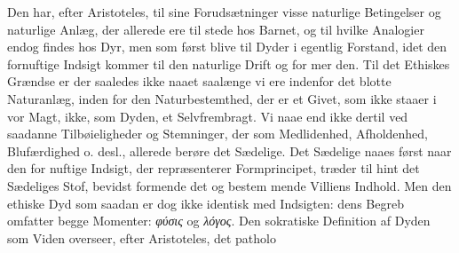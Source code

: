 \documentclass[12pt,a4paper]{book}
\newcommand{\gk}[1]{\textit{#1}}
\begin{document}
Den har, efter Aristoteles, til sine Forudsætninger visse
naturlige Betingelser og naturlige Anlæg, der allerede ere til\-%
stede hos Barnet, og til hvilke Analogier endog findes hos
Dyr, men som først blive til Dyder i egentlig Forstand, idet
den fornuftige Indsigt kommer til den naturlige Drift og for\-%
mer den. Til det Ethiskes Grændse er der saaledes ikke
naaet saalænge vi ere indenfor det blotte Naturanlæg, inden\-%
for den Naturbestemthed, der er et Givet, som ikke staaer i
vor Magt, ikke, som Dyden, et Selvfrembragt. Vi naae end
ikke dertil ved saadanne Tilbøieligheder og Stemninger, der
som Medlidenhed, Afholdenhed, Blufærdighed o. desl., allerede
berøre det Sædelige. Det Sædelige naaes først naar den for\-%
%
nuftige Indsigt, der repræsenterer Formprincipet, træder til
hint det Sædeliges Stof, bevidst formende det og bestem\-%
mende Villiens Indhold. Men den ethiske Dyd som saadan
er dog ikke identisk med Indsigten: dens Begreb omfatter
begge Momenter: \gk{φύσις} og \gk{λόγος}. Den sokratiske Definition
af Dyden som Viden overseer, efter Aristoteles, det patholo\-%
\end{document}
